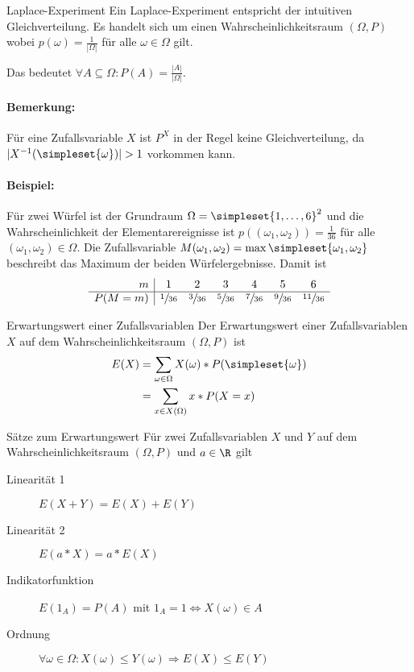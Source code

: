 \begin{definition}{Laplace-Experiment}
	Ein Laplace-Experiment entspricht der intuitiven Gleichverteilung. Es handelt sich um einen Wahrscheinlichkeitsraum $(\Omega,P)$ wobei $p(\omega)=\frac 1{|\Omega|}$ für alle $\omega\in\Omega$ gilt.
	
	Das bedeutet $\forall A\subseteq \Omega:P(A)=\frac{|A|}{|\Omega|}$.
\end{definition}
\paragraph{Bemerkung:}
Für eine Zufallsvariable $X$ ist $P^X$ in der Regel keine Gleichverteilung, da $|X^{-1}(\simpleset{\omega})|>1$ vorkommen kann.

\paragraph{Beispiel:}
Für zwei Würfel ist der Grundraum $\Omega=\simpleset{1,\ldots,6}^2$ und die Wahrscheinlichkeit der Elementarereignisse ist $p((\omega_1,\omega_2))=\frac{1}{36}$ für alle $(\omega_1,\omega_2)\in\Omega$. Die Zufallsvariable $M(\omega_1,\omega_2)=\max\simpleset{\omega_1,\omega_2}$ beschreibt das Maximum der beiden Würfelergebnisse. Damit ist 
\begin{equation*}
	\begin{array}{r|cccccc}
		m&1&2&3&4&5&6\\
		\hline P(M=m)&\sfrac{1}{36}&\sfrac{3}{36}&\sfrac{5}{36}&\sfrac{7}{36}&\sfrac{9}{36}&\sfrac{11}{36}
	\end{array}
\end{equation*}

\begin{definition}{Erwartungswert einer Zufallsvariablen}
	Der Erwartungswert einer Zufallsvariablen $X$ auf dem Wahrscheinlichkeitsraum $(\Omega,P)$ ist
	\begin{align*}
		E(X)&=\sum_{\omega\in\Omega} X(\omega)*P(\simpleset{\omega})\\
		&=\sum_{x\in X(\Omega)}x*P(X=x)
	\end{align*}
\end{definition}

\begin{satz}{Sätze zum Erwartungswert}
	Für zwei Zufallsvariablen $X$ und $Y$ auf dem Wahrscheinlichkeitsraum $(\Omega,P)$ und $a\in\R$ gilt
	\begin{description}
		\item[Linearität 1] $E(X+Y)=E(X)+E(Y)$
		\item[Linearität 2] $E(a*X)=a*E(X)$
		\item[Indikatorfunktion] $E(1_A)=P(A)$ mit $1_A=1\Leftrightarrow X(\omega)\in A$
		\item[Ordnung] $\forall \omega\in\Omega: X(\omega)\leq Y(\omega) \Rightarrow E(X)\leq E(Y)$
	\end{description}
\end{satz}

